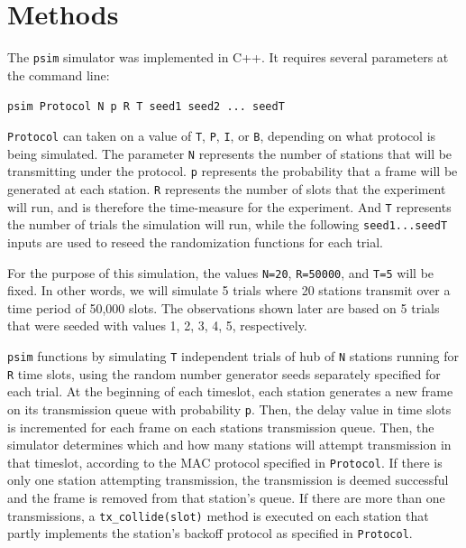 \documentclass[twocolumn]{article}
\begin{document}

\section*{Methods}

The \verb|psim| simulator was implemented in C++. It requires several parameters
at the command line:

\begin{center}\verb|psim Protocol N p R T seed1 seed2 ... seedT|\end{center}

 \verb|Protocol| can taken on a value of \verb|T|, \verb|P|, \verb|I|, or \verb|B|, depending on
what protocol is being simulated. The parameter \verb|N| represents the number of
stations that will be transmitting under the protocol. \verb|p| represents the
probability that a frame will be generated at each station. \verb|R| represents the
number of slots that the experiment will run, and is therefore the time-measure
for the experiment. And \verb|T| represents the number of trials the simulation will
run, while the following \verb|seed1...seedT| inputs are used to reseed the
randomization functions for each trial. 

For the purpose of this simulation, the
values \verb|N=20|, \verb|R=50000|, and \verb|T=5| will be fixed. In other words, we will
simulate 5 trials where 20 stations transmit over a time period of 50,000 slots.
The observations shown later are based on 5 trials that were seeded with values
1, 2, 3, 4, 5, respectively.

\verb|psim| functions by simulating \verb|T| independent trials of hub of
\verb|N| stations running for \verb|R| time slots, using the random number
generator seeds separately specified for each trial. At the beginning of each
timeslot, each station generates a new frame on its transmission queue with
probability \verb|p|. Then, the delay value in time slots is incremented for
each frame on each stations transmission queue.  Then, the simulator determines
which and how many stations will attempt transmission in that timeslot,
according to the MAC protocol specified in \verb|Protocol|. If there is only one
station attempting transmission, the transmission is deemed successful and the
frame is removed from that station's queue. If there are more than one
transmissions, a \verb|tx_collide(slot)| method is executed on each station that
partly implements the station's backoff protocol as specified in
\verb|Protocol|.
\end{document}
